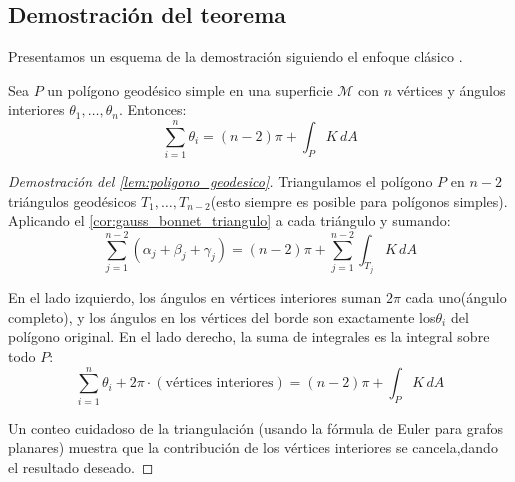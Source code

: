 \subsection{Demostración del teorema}\label{subsec:gauss_bonnet_demostracion}

Presentamos un esquema de la demostración siguiendo el enfoque clásico \citep{do1976differential,lee2018introduction}.

\begin{lemma}\label{lem:poligono_geodesico}
Sea $P$ un polígono geodésico simple en una superficie $\mathcal{M}$ con $n$ vértices y ángulos interiores $\theta_1, \ldots, \theta_n$. Entonces:
\begin{equation}\label{eq:poligono_geodesico}
\sum_{i=1}^n \theta_i = (n-2)\pi + \int_P K \, dA
\end{equation}
\end{lemma}

\begin{proof}[Demostración del \autoref{lem:poligono_geodesico}]Triangulamos el polígono $P$ en $n-2$ triángulos geodésicos $T_1, \ldots, T_{n-2}$(esto siempre es posible para polígonos simples). Aplicando el \autoref{cor:gauss_bonnet_triangulo} a cada triángulo y sumando:
\[
\sum_{j=1}^{n-2} (\alpha_j + \beta_j + \gamma_j) = (n-2)\pi + \sum_{j=1}^{n-2} \int_{T_j} K \, dA
\]

En el lado izquierdo, los ángulos en vértices interiores suman $2\pi$ cada uno(ángulo completo), y los ángulos en los vértices del borde son exactamente los$\theta_i$ del polígono original. En el lado derecho, la suma de integrales es la integral sobre todo $P$:
\[
\sum_{i=1}^n \theta_i + 2\pi \cdot (\text{vértices interiores}) = (n-2)\pi + \int_P K \, dA
\]

Un conteo cuidadoso de la triangulación (usando la fórmula de Euler para grafos planares) muestra que la contribución de los vértices interiores se cancela,dando el resultado deseado.
\end{proof}

